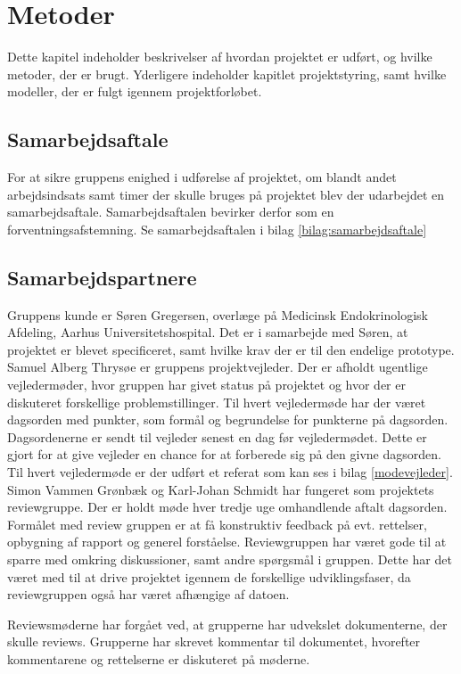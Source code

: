 \chapter{Metoder}
Dette kapitel indeholder beskrivelser af hvordan projektet er udført, og hvilke metoder, der er brugt. Yderligere indeholder kapitlet projektstyring, samt hvilke modeller, der er fulgt igennem projektforløbet. 

\section{Samarbejdsaftale}
For at sikre gruppens enighed i udførelse af projektet, om blandt andet arbejdsindsats samt timer der skulle bruges på projektet blev der udarbejdet en samarbejdsaftale. Samarbejdsaftalen bevirker derfor som en forventningsafstemning. Se samarbejdsaftalen i bilag \ref{bilag:samarbejdsaftale}

\section{Samarbejdspartnere}
Gruppens kunde er Søren Gregersen, overlæge på Medicinsk Endokrinologisk Afdeling, Aarhus Universitetshospital. Det er i samarbejde med Søren, at projektet er blevet specificeret, samt hvilke krav der er til den endelige prototype.
Samuel Alberg Thrysøe er gruppens projektvejleder. Der er afholdt ugentlige vejledermøder, hvor gruppen har givet status på projektet og hvor der er diskuteret forskellige problemstillinger. Til hvert vejledermøde har der været dagsorden med punkter, som formål og begrundelse for punkterne på dagsorden. Dagsordenerne er sendt til vejleder senest en dag før vejledermødet. Dette er gjort for at give vejleder en chance for at forberede sig på den givne dagsorden. Til hvert vejledermøde er der udført et referat som kan ses i bilag \ref{modevejleder}.
Simon Vammen Grønbæk og Karl-Johan Schmidt har fungeret som projektets reviewgruppe. Der er holdt møde hver tredje uge omhandlende aftalt dagsorden. Formålet med review gruppen er at få konstruktiv feedback på evt. rettelser, opbygning af rapport og generel forståelse. Reviewgruppen har været gode til at sparre med omkring diskussioner, samt andre spørgsmål i gruppen. Dette har det været med til at drive projektet igennem de forskellige udviklingsfaser, da reviewgruppen også har været afhængige af datoen.

Reviewsmøderne har forgået ved, at grupperne har udvekslet dokumenterne, der skulle reviews. Grupperne har skrevet kommentar til dokumentet, hvorefter kommentarene og rettelserne er diskuteret på møderne. 

